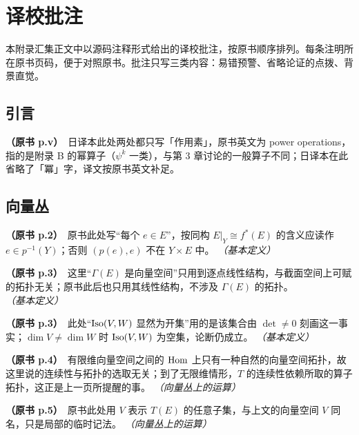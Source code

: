 \chapter*{译校批注}

本附录汇集正文中以源码注释形式给出的译校批注，按原书顺序排列。每条注明所在原书页码，便于对照原书。批注只写三类内容：易错预警、省略论证的点拨、背景直觉。\par\medskip

\section*{引言}

\noindent \textbf{（原书 p.v）}\ 日译本此处两处都只写「作用素」，原书英文为 power operations，指的是附录 B 的幂算子（$\psi^{k}$ 一类），与第 3 章讨论的一般算子不同；日译本在此省略了「冪」字，译文按原书英文补足。\par\smallskip

\section*{向量丛}

\noindent \textbf{（原书 p.2）}\ 原书此处写“每个 $e\in E$”，按同构 $E|_Y\cong f^*(E)$ 的含义应读作 $e\in p^{-1}(Y)$；否则 $(p(e),e)$ 不在 $Y\times E$ 中。 \textit{（基本定义）}\par\smallskip

\noindent \textbf{（原书 p.3）}\ 这里“$\Gamma(E)$ 是向量空间”只用到逐点线性结构，与截面空间上可赋的拓扑无关；原书此后也只用其线性结构，不涉及 $\Gamma(E)$ 的拓扑。 \textit{（基本定义）}\par\smallskip

\noindent \textbf{（原书 p.3）}\ 此处“$\operatorname{Iso}(V,W)$ 显然为开集”用的是该集合由 $\det\neq0$ 刻画这一事实；$\dim V\neq\dim W$ 时 $\operatorname{Iso}(V,W)$ 为空集，论断仍成立。 \textit{（基本定义）}\par\smallskip

\noindent \textbf{（原书 p.4）}\ 有限维向量空间之间的 $\operatorname{Hom}$ 上只有一种自然的向量空间拓扑，故这里说的连续性与拓扑的选取无关；到了无限维情形，$T$ 的连续性依赖所取的算子拓扑，这正是上一页所提醒的事。 \textit{（向量丛上的运算）}\par\smallskip

\noindent \textbf{（原书 p.5）}\ 原书此处用 $V$ 表示 $T(E)$ 的任意子集，与上文的向量空间 $V$ 同名，只是局部的临时记法。 \textit{（向量丛上的运算）}\par\smallskip

